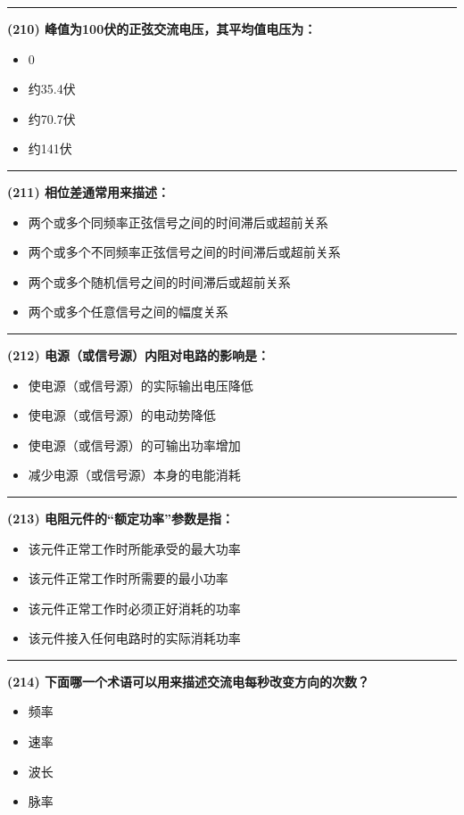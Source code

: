 \documentclass[twocolumn]{ctexart}  %
\begin{document}
\noindent\rule{0.5\textwidth}{1pt}
\heiti \textbf{(210) 峰值为100伏的正弦交流电压，其平均值电压为：} \songti {\color{gray} [LK0519] }
\begin{itemize}
	\item  0
	\item  约35.4伏
	\item  约70.7伏
	\item  约141伏
\end{itemize}


\noindent\rule{0.5\textwidth}{1pt}
\heiti \textbf{(211) 相位差通常用来描述：} \songti {\color{gray} [LK0529] }
\begin{itemize}
	\item  两个或多个同频率正弦信号之间的时间滞后或超前关系
	\item  两个或多个不同频率正弦信号之间的时间滞后或超前关系
	\item  两个或多个随机信号之间的时间滞后或超前关系
	\item  两个或多个任意信号之间的幅度关系
\end{itemize}


\noindent\rule{0.5\textwidth}{1pt}
\heiti \textbf{(212) 电源（或信号源）内阻对电路的影响是：} \songti {\color{gray} [LK0537] }
\begin{itemize}
	\item  使电源（或信号源）的实际输出电压降低
	\item  使电源（或信号源）的电动势降低
	\item  使电源（或信号源）的可输出功率增加
	\item  减少电源（或信号源）本身的电能消耗
\end{itemize}


\noindent\rule{0.5\textwidth}{1pt}
\heiti \textbf{(213) 电阻元件的“额定功率”参数是指：} \songti {\color{gray} [LK0577] }
\begin{itemize}
	\item  该元件正常工作时所能承受的最大功率
	\item  该元件正常工作时所需要的最小功率
	\item  该元件正常工作时必须正好消耗的功率
	\item  该元件接入任何电路时的实际消耗功率
\end{itemize}


\noindent\rule{0.5\textwidth}{1pt}
\heiti \textbf{(214) 下面哪一个术语可以用来描述交流电每秒改变方向的次数？} \songti {\color{gray} [LK1107] }
\begin{itemize}
	\item  频率
	\item  速率
	\item  波长
	\item  脉率
\end{itemize}
\end{document}
